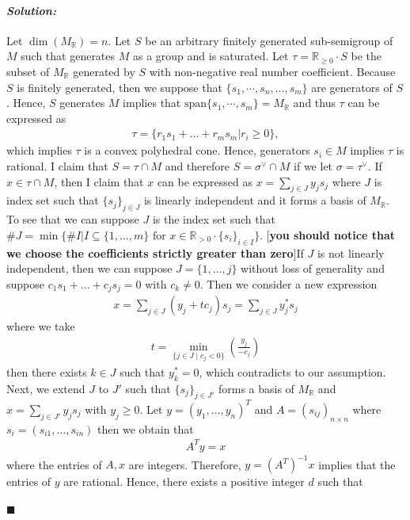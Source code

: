 \documentclass[12pt, a4paper]{article}
\newenvironment{solution}
  {\paragraph{\textit{Solution:}}\par\medskip}
  {\hfill$\blacksquare$\vspace{0.1cm}}
\begin{document}
\begin{solution}
    Let $\dim(M_\mathbb{R})= n$.
    Let $S$ be an arbitrary finitely generated sub-semigroup of $M$ such that generates $M$ as a group and is saturated.
    Let $\tau=\mathbb{R}_{\ge 0}\cdot S$ be the subset of $M_{\mathbb{R}}$ generated by $S$ with non-negative real number coefficient.
    Because $S$ is finitely generated, then we suppose that $\{s_1,\cdots,s_n,\dots,s_{m}\}$ are generators of $S$.
    Hence, $S$ generates $M$ implies that $\text{span}\{s_1,\cdots,s_{m}\}=M_{\mathbb{R}}$ and thus 
    $\tau$ can be expressed as 
    \begin{align*}
        \tau = \{r_1s_1+\dots+r_ms_m|r_i\ge 0 \},
    \end{align*}
    which implies $\tau$ is a convex polyhedral cone. Hence, generators $s_i\in M$ implies $\tau$ is rational. 
    I claim that $S = \tau\cap M$ and therefore $S=\sigma^{\vee}\cap M$ if we let $\sigma=\tau^\vee$. 
    If $x\in \tau\cap M$, then I claim that $x$ can be expressed as $x= \sum_{j\in J} y_js_j$ where $J$ is index set such that $\{s_j\}_{j\in J}$ is linearly independent and it forms a basis of $M_{\mathbb{R}}$.
    To see that we can suppose $J$ is the index set such that $\#J= \min\{\# I|I\subseteq \{1,\dots,m\}\text{ for $x\in \mathbb{R}_{> 0}\cdot \{s_i\}_{i\in I}$} \}$. [\textbf{you should notice that we choose the coefficients strictly greater than zero}]If $J$ is not linearly independent, then 
    we can suppose $J=\{1,\dots,j\}$ without loss of generality and suppose $c_1s_1+\dots+c_js_j=0$ with $c_k\neq 0$. Then we consider a new expression
    \begin{align*}
        x =  \sum_{j\in J} (y_j+tc_j)s_j = \sum_{j\in J} y^*_{j} s_j
    \end{align*}
    where we take 
    \begin{align*}
        t = \min_{\{j \in J \mid c_j < 0\}} \left( \frac{y_j}{-c_j} \right)
    \end{align*}
    then there exists $k\in J$ such that $y_k^*=0$, which contradicts to our assumption.
    Next, we extend $J$ to $J'$ such that $\{s_j\}_{j\in J'}$ forms a basis of $M_{\mathbb{R}}$ and $x=\sum_{j\in J'}y_js_j$ with $y_j\ge 0$. Let $y=(y_1,\dots,y_n)^T$ and $A=(s_{ij})_{n\times n}$
    where $s_i = (s_{i1},\dots,s_{in})$ then we obtain that 
    \begin{align*}
        A^T y = x
    \end{align*}
    where the entries of $A,x$ are integers. Therefore, $y = (A^T)^{-1}x$ implies that the entries of $y$ are rational. Hence, there exists a positive integer $d$ such that 

\end{solution}
\end{document}
